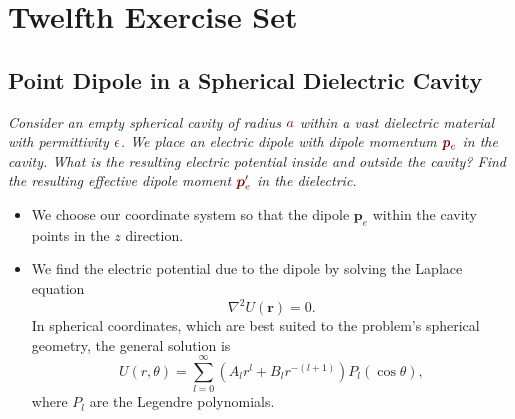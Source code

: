 \documentclass[11pt, a4paper]{article}
\newcommand{\dmath}[1]{\textcolor{Maroon}{#1}}  %
\renewcommand{\vec}[1]{\bm{#1}} %
\renewcommand{\r}{\vec{r}}
\newcommand{\e}{\epsilon}
\newcommand{\pe}{\vec{p}_{e}}  %
\renewcommand{\laplacian}{\nabla^{2}}
\begin{document}
\newpage
\section{Twelfth Exercise Set}
\subsection{Point Dipole in a Spherical Dielectric Cavity}
\textit{Consider an empty spherical cavity of radius $ \dmath{a} $ within a vast dielectric material with permittivity $ \dmath{\e} $. We place an electric dipole with dipole momentum $ \dmath{\pe} $ in the cavity. What is the resulting electric potential inside and outside the cavity? Find the resulting effective dipole moment $ \dmath{\pe'} $ in the dielectric.}
\begin{itemize}
	\item  We choose our coordinate system so that the dipole $ \pe $ within the cavity points in the $ z $ direction.
	
	
	\item We find the electric potential due to the dipole by solving the Laplace equation 
	\begin{equation*}
		\laplacian U(\r) = 0.
	\end{equation*}
	In spherical coordinates, which are best suited to the problem's spherical geometry, the general solution is
	\begin{equation*}
		U(r, \theta) = \sum_{l = 0}^{\infty}(A_{l}r^{l} + B_{l}r^{-(l+1)})P_{l}(\cos \theta),
	\end{equation*}
	where $ P_{l} $ are the Legendre polynomials.
	

\end{itemize}
\end{document}
